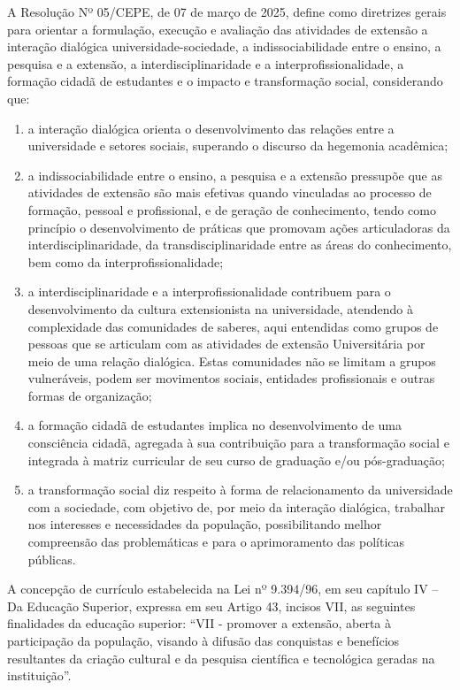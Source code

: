 A Resolução Nº 05/CEPE, de 07 de março de 2025, define como diretrizes gerais para orientar a formulação, execução e avaliação das atividades de extensão a interação dialógica universidade-sociedade, a indissociabilidade entre o ensino, a pesquisa e a extensão, a interdisciplinaridade e a interprofissionalidade, a formação cidadã de estudantes e o impacto e transformação social, considerando que:

\begin{enumerate}[label=\Roman* --, leftmargin=*]
    \item a interação dialógica orienta o desenvolvimento das relações entre a universidade e setores sociais, superando o discurso da hegemonia acadêmica;
    \item a indissociabilidade entre o ensino, a pesquisa e a extensão pressupõe que as atividades de extensão são mais efetivas quando vinculadas ao processo de formação, pessoal e profissional, e de geração de conhecimento, tendo como princípio o desenvolvimento de práticas que promovam ações articuladoras da interdisciplinaridade, da transdisciplinaridade entre as áreas do conhecimento, bem como da interprofissionalidade;
    \item a interdisciplinaridade e a interprofissionalidade contribuem para o desenvolvimento da cultura extensionista na universidade, atendendo à complexidade das comunidades de saberes, aqui entendidas como grupos de pessoas que se articulam com as atividades de extensão Universitária por meio de uma relação dialógica. Estas comunidades não se limitam a grupos vulneráveis, podem ser movimentos sociais, entidades profissionais e outras formas de organização;
    \item a formação cidadã de estudantes implica no desenvolvimento de uma consciência cidadã, agregada à sua contribuição para a transformação social e integrada à matriz curricular de seu curso de graduação e/ou pós-graduação;
    \item a transformação social diz respeito à forma de relacionamento da universidade com a sociedade, com objetivo de, por meio da interação dialógica, trabalhar nos interesses e necessidades da população, possibilitando melhor compreensão das problemáticas e para o aprimoramento das políticas públicas.
\end{enumerate}

A concepção de currículo estabelecida na Lei nº 9.394/96, em seu capítulo IV – Da Educação Superior, expressa em seu Artigo 43, incisos VII, as seguintes finalidades da educação superior: ``VII - promover a extensão, aberta à participação da população, visando à difusão das conquistas e benefícios resultantes da criação cultural e da pesquisa científica e tecnológica geradas na instituição''. 

